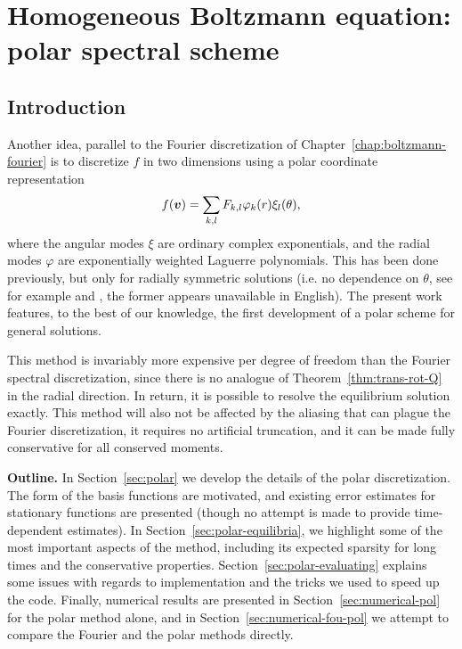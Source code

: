 \chapter{Homogeneous Boltzmann equation: polar spectral scheme}
\label{chap:boltzmann-polar}

\section{Introduction} 
\label{sect:polar-intro}

Another idea, parallel to the Fourier discretization of Chapter~\ref{chap:boltzmann-fourier} is to discretize
$f$ in two dimensions using a polar coordinate representation
\[
    f({\bm v}) = \sum_{k,l} F_{k,l} \varphi_k(r) \xi_l(\theta),
\]
where the angular modes $\xi$ are ordinary complex exponentials, and the radial modes $\varphi$ are
exponentially weighted Laguerre polynomials. This has been done previously, but only for radially symmetric
solutions (i.e. no dependence on $\theta$, see for example \cite{Ender94} and \cite{Ender99}, the former
appears unavailable in English). The present work features, to the best of our knowledge, the first
development of a polar scheme for general solutions.

This method is invariably more expensive per degree of freedom than the Fourier spectral discretization, since
there is no analogue of Theorem~\ref{thm:trans-rot-Q} in the radial direction. In return, it is possible to
resolve the equilibrium solution exactly. This method will also not be affected by the aliasing that can
plague the Fourier discretization, it requires no artificial truncation, and it can be made fully conservative
for all conserved moments.

\textbf{Outline.} In Section~\ref{sec:polar} we develop the details of the polar discretization. The form of
the basis functions are motivated, and existing error estimates for stationary functions are presented (though
no attempt is made to provide time-dependent estimates). In Section~\ref{sec:polar-equilibria}, we highlight
some of the most important aspects of the method, including its expected sparsity for long times and the
conservative properties. Section~\ref{sec:polar-evaluating} explains some issues with regards to
implementation and the tricks we used to speed up the code. Finally, numerical results are presented in
Section~\ref{sec:numerical-pol} for the polar method alone, and in Section~\ref{sec:numerical-fou-pol} we
attempt to compare the Fourier and the polar methods directly.


